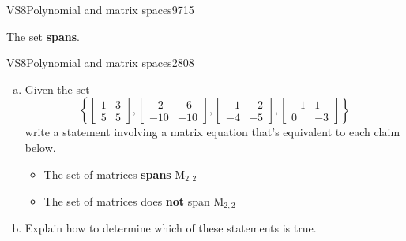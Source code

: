\begin{exercise}{VS8}{Polynomial and matrix spaces}{9715}
\begin{exerciseAnswer}
 

 The set \textbf{spans}. 

 \end{exerciseAnswer}
 \end{exercise}


\begin{exercise}{VS8}{Polynomial and matrix spaces}{2808} 
\begin{exerciseStatement} 

\begin{enumerate}[(a)]
\item  

 Given the set \[\left\{ \left[\begin{array}{cc}
1 & 3 \\
5 & 5
\end{array}\right] , \left[\begin{array}{cc}
-2 & -6 \\
-10 & -10
\end{array}\right] , \left[\begin{array}{cc}
-1 & -2 \\
-4 & -5
\end{array}\right] , \left[\begin{array}{cc}
-1 & 1 \\
0 & -3
\end{array}\right] \right\}\] write a statement involving a matrix equation that's equivalent to each claim below. 

 

\begin{itemize}
\item  

 The set of matrices \textbf{spans} \(\mathrm{M}_{2,2}\) 

 
\item  

 The set of matrices does \textbf{not} span \(\mathrm{M}_{2,2}\) 

 
\end{itemize}

     
\item  

 Explain how to determine which of these statements is true. 

 
\end{enumerate}

     \end{exerciseStatement}
 \begin{exerciseAnswer} 


\end{exerciseAnswer}
\end{exercise}
